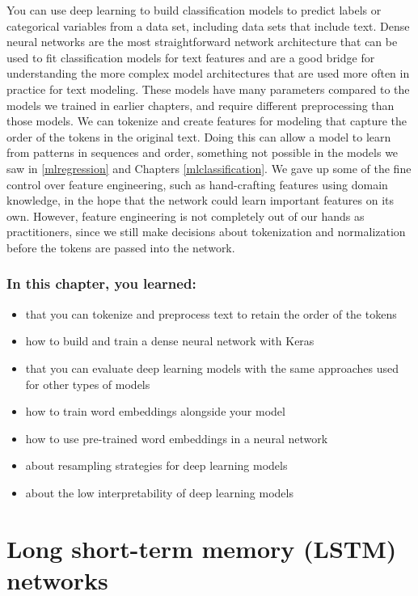 \documentclass[
]{krantz}
\begin{document}
You can use deep learning to build classification models to predict labels or categorical variables from a data set, including data sets that include text.
Dense neural networks are the most straightforward network architecture that can be used to fit classification models for text features and are a good bridge for understanding the more complex model architectures that are used more often in practice for text modeling.
These models have many parameters compared to the models we trained in earlier chapters, and require different preprocessing than those models.
We can tokenize and create features for modeling that capture the order of the tokens in the original text. Doing this can allow a model to learn from patterns in sequences and order, something not possible in the models we saw in \ref{mlregression} and Chapters \ref{mlclassification}.
We gave up some of the fine control over feature engineering, such as hand-crafting features using domain knowledge, in the hope that the network could learn important features on its own.
However, feature engineering is not completely out of our hands as practitioners, since we still make decisions about tokenization and normalization before the tokens are passed into the network.

\hypertarget{in-this-chapter-you-learned-7}{%
\subsection{In this chapter, you learned:}\label{in-this-chapter-you-learned-7}}

\begin{itemize}
\item
  that you can tokenize and preprocess text to retain the order of the tokens
\item
  how to build and train a dense neural network with Keras
\item
  that you can evaluate deep learning models with the same approaches used for other types of models
\item
  how to train word embeddings alongside your model
\item
  how to use pre-trained word embeddings in a neural network
\item
  about resampling strategies for deep learning models
\item
  about the low interpretability of deep learning models
\end{itemize}

\hypertarget{dllstm}{%
\chapter{Long short-term memory (LSTM) networks}\label{dllstm}}
\end{document}
